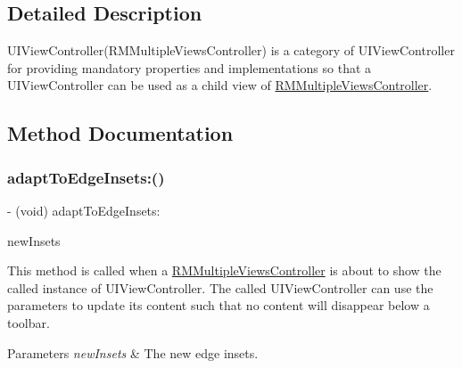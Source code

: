 \subsection{Detailed Description}
{\ttfamily U\+I\+View\+Controller(\+R\+M\+Multiple\+Views\+Controller)} is a category of {\ttfamily U\+I\+View\+Controller} for providing mandatory properties and implementations so that a U\+I\+View\+Controller can be used as a child view of {\ttfamily \mbox{\hyperlink{interface_r_m_multiple_views_controller}{R\+M\+Multiple\+Views\+Controller}}}. 

\subsection{Method Documentation}
\mbox{\label{category_u_i_view_controller_07_r_m_multiple_views_controller_08_aabb1120009219637f60bd53874cab7ef}} 
\subsubsection{\texorpdfstring{adapt\+To\+Edge\+Insets\+:()}{adaptToEdgeInsets:()}}
{\footnotesize\ttfamily -\/ (void) adapt\+To\+Edge\+Insets\+: \begin{DoxyParamCaption}\item[{(U\+I\+Edge\+Insets)}]{new\+Insets }\end{DoxyParamCaption}}

This method is called when a {\ttfamily \mbox{\hyperlink{interface_r_m_multiple_views_controller}{R\+M\+Multiple\+Views\+Controller}}} is about to show the called instance of {\ttfamily U\+I\+View\+Controller}. The called {\ttfamily U\+I\+View\+Controller} can use the parameters to update it\textquotesingle{}s content such that no content will disappear below a toolbar.


\begin{DoxyParams}{Parameters}
{\em new\+Insets} & The new edge insets. \\
\hline
\end{DoxyParams}


